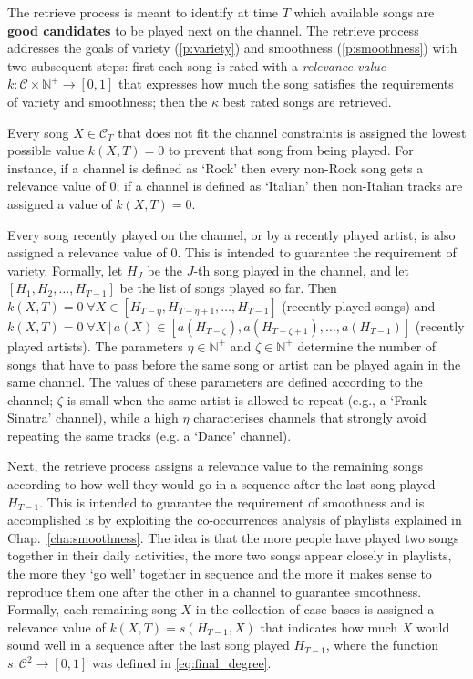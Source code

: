 The retrieve process is meant to identify at time $T$ which available songs  are \textbf{good candidates} to be played next on the channel.
The retrieve process addresses the goals of variety (\ref{p:variety}) and smoothness (\ref{p:smoothness}) with two subsequent steps: 
first each song is rated with a \emph{relevance value} $k: \mathcal{C} \times \mathbb{N}^+ \to [0,1]$ that expresses how much the song satisfies the requirements of variety and smoothness; then the $\kappa$ best rated songs are retrieved.

Every song $X \in \mathcal{C}_T$ that does not fit the channel constraints is assigned the lowest possible value $k(X,T) = 0$ to prevent that song from being played.
For instance, if a channel is defined as `Rock' then every non-Rock song gets a relevance value of 0; if a channel is defined as `Italian' then non-Italian tracks are assigned a value of $k(X,T) = 0$.

Every song recently played on the channel, or by a recently played artist, is also assigned a relevance value of 0.
This is intended to guarantee the requirement of variety.
Formally, let $H_J$ be the $J$-th song played in the channel, and let $[H_1, H_2, \ldots, H_{T-1}]$ be the list of songs played so far.
Then $k(X,T) = 0 \; \forall X \in [H_{T-\eta}, H_{T-\eta+1}, \ldots, H_{T-1}]$ (recently played songs) and $k(X,T) = 0 \; \forall X\,|\,a(X) \in [a(H_{T-\zeta}), a(H_{T-\zeta+1}), \ldots, a(H_{T-1})]$ (recently played artists).
The parameters $\eta \in \mathbb{N}^+$ and $\zeta \in \mathbb{N}^+$ determine the number of songs that have to pass before the same song or artist can be played again in the same channel.
The values of these parameters are defined according to the channel; $\zeta$ is small when the same artist is allowed to repeat (e.g., a `Frank Sinatra' channel), while a high $\eta$ characterises channels that strongly avoid repeating the same tracks (e.g. a `Dance' channel). 

Next, the retrieve process assigns a relevance value to the remaining songs according to how well they would go in a sequence after the last song played $H_{T-1}$. 
This is intended to guarantee the requirement of smoothness and is accomplished is by exploiting the co-occurrences analysis of playlists explained in Chap.~\ref{cha:smoothness}.
The idea is that the more people have played two songs together in their daily activities, the more two songs appear closely in playlists, the more they `go well' together in sequence and the more it makes sense to reproduce them one after the other in a channel to guarantee smoothness.
Formally, each remaining song $X$ in the collection of case bases is assigned a relevance value of $k(X,T) = s(H_{T-1}, X)$ that indicates how much $X$ would sound well in a sequence after the last song played $H_{T-1}$, where the function $s: \mathcal{C}^2 \to [0,1]$ was defined in \eqref{eq:final_degree}.

